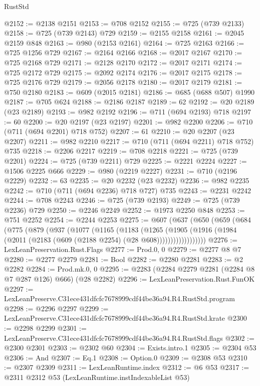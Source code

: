 \begin{lexlean}{RustStd}
\begin{coremodule}
@2152 := @2138 @2151
@2153 := @708 @2152
@2155 := @725 (@739 @2133)
@2158 := @725 (@739 @2143) @729
@2159 := @2155 @2158
@2161 := @2045 @2159 @848
@2163 := @980 (@2153 @2161)
@2164 := @725 @2163
@2166 := @725 @1256 @729
@2167 := @2164 @2166
@2168 := @2017 @2167
@2170 := @725 @2168 @729
@2171 := @2128 @2170
@2172 := @2017 @2171
@2174 := @725 @2172 @729
@2175 := @2092 @2174
@2176 := @2017 @2175
@2178 := @725 @2176 @729
@2179 := @2056 @2178
@2180 := @2017 @2179
@2181 := @750 @2180
@2183 := @609 (@2015 @2181)
@2186 := @685 (@688 @507) @1990
@2187 := @705 @624
@2188 := @2186 @2187
@2189 := 62
@2192 := @20 @2189 (@23 @2189)
@2193 := @982 @2192
@2196 := @711 (@694 @2193) @718
@2197 := 60
@2200 := @20 @2197 (@23 @2197)
@2201 := @982 @2200
@2206 := @710 (@711 (@694 @2201) @718 @752)
@2207 := 61
@2210 := @20 @2207 (@23 @2207)
@2211 := @982 @2210
@2217 := @710 (@711 (@694 @2211) @718 @752) @735
@2218 := @2206 @2217
@2219 := @708 @2218
@2221 := @725 (@739 @2201)
@2224 := @725 (@739 @2211) @729
@2225 := @2221 @2224
@2227 := @1506 @2225 @666
@2229 := @980 (@2219 @2227)
@2231 := @710 (@2196 @2229)
@2232 := 63
@2235 := @20 @2232 (@23 @2232)
@2236 := @982 @2235
@2242 := @710 (@711 (@694 @2236) @718 @727) @735
@2243 := @2231 @2242
@2244 := @708 @2243
@2246 := @725 (@739 @2193)
@2249 := @725 (@739 @2236) @729
@2250 := @2246 @2249
@2252 := @1973 @2250 @848
@2253 := @751 @2252
@2254 := @2244 @2253
@2275 := @607
    (@637
      (@650
        (@659
          (@684
            (@775
              (@879
                (@937
                  (@1077
                    (@1165
                      (@1183
                        (@1265
                          (@1905
                            (@1916
                              (@1984 (@2011 (@2183 (@609 (@2188 @2254) (@28 @608))))))))))))))))))
@2276 := LexLeanPreservation.Rust.Flags
@2277 := Prod.{0, 0}
@2279 := @2277 @8 @7
@2280 := @2277 @2279
@2281 := Bool
@2282 := @2280 @2281
@2283 := @2 @2282
@2284 := Prod.mk.{0, 0}
@2295 := @2283 (@2284 @2279 @2281 (@2284 @8 @7 @287 @126) @666) (@28 @2282)
@2296 := LexLeanPreservation.Rust.FunOK
@2297 := LexLeanPreserve.C31ece431dfcfc7678999cdf44be36a94.R4.RustStd.program
@2298 := @2296 @2297
@2299 := LexLeanPreserve.C31ece431dfcfc7678999cdf44be36a94.R4.RustStd.krate
@2300 := @2298 @2299
@2301 := LexLeanPreserve.C31ece431dfcfc7678999cdf44be36a94.R4.RustStd.flags
@2302 := @2300 @2301
@2303 := @2302 @60
@2304 := Exists.intro.{1}
@2305 := @2304 @53
@2306 := And
@2307 := Eq.{1}
@2308 := Option.{0}
@2309 := @2308 @53
@2310 := @2307 @2309
@2311 := LexLeanRuntime.index
@2312 := @6 @53
@2317 := @2311 @2312 @53 (LexLeanRuntime.instIndexableList @53)

\end{coremodule}
\end{lexlean}
